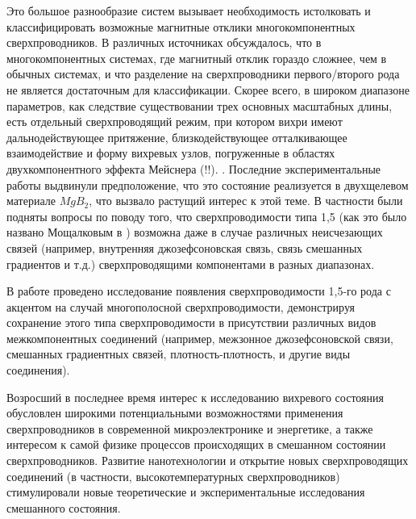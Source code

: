 Это большое разнообразие систем вызывает необходимость истолковать и 
классифицировать возможные магнитные отклики многокомпонентных 
сверхпроводников. В различных источниках обсуждалось, что в многокомпонентных 
системах, где магнитный отклик гораздо сложнее, чем в обычных системах, и что 
разделение на сверхпроводники первого/второго рода не является достаточным для 
классификации. Скорее всего, в широком диапазоне параметров, как следствие 
существовании трех основных масштабных длины, есть отдельный сверхпроводящий 
режим, при котором вихри имеют дальнодействующее притяжение, близкодействующее 
отталкивающее взаимодействие и форму вихревых узлов, погруженные в областях 
двухкомпонентного эффекта Мейснера (!!). \cite{bib:1,bib:2}. Последние 
экспериментальные работы \cite{bib:16,bib:17} выдвинули предположение, что 
это состояние реализуется в двухщелевом материале \( MgB_2 \), что вызвало 
растущий интерес к этой теме. В частности были подняты вопросы по поводу того, 
что сверхпроводимости типа 1,5 (как это было названо Мощалковым в 
\cite{bib:16}) возможна даже в случае различных неисчезающих связей (например, 
внутренняя джозефсоновская связь, связь смешанных градиентов и т.д.) 
сверхпроводящими компонентами в разных диапазонах. \cite{bib:main}

В работе проведено исследование появления сверхпроводимости 1,5-го рода с 
акцентом на случай многополосной сверхпроводимости, демонстрируя сохранение 
этого типа сверхпроводимости в присутствии различных видов межкомпонентных 
соединений (например, межзонное джозефсоновской связи, смешанных градиентных 
связей, плотность-плотность, и другие виды соединения).

Возросший в последнее время интерес к исследованию вихревого состояния 
обусловлен широкими потенциальными возможностями применения сверхпроводников в 
современной микроэлектронике и энергетике, а также интересом к самой физике 
процессов происходящих в смешанном состоянии сверхпроводников. Развитие 
нанотехнологии и открытие новых сверхпроводящих соединений (в частности, 
высокотемпературных сверхпроводников) стимулировали новые теоретические и
экспериментальные исследования смешанного состояния. 

